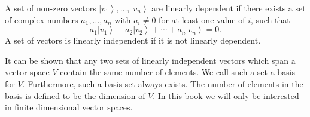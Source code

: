 A set of non-zero vectors $\left|v_{1}\right\rangle, \ldots,\left|v_{n}\right\rangle$ are linearly dependent if there exists a set of complex numbers $a_{1}, \ldots, a_{n}$ with $a_{i} \neq 0$ for at least one value of $i$, such that
$$
a_{1}\left|v_{1}\right\rangle+a_{2}\left|v_{2}\right\rangle+\cdots+a_{n}\left|v_{n}\right\rangle=0.
$$
A set of vectors is linearly independent if it is not linearly dependent. 

It can be shown that any two sets of linearly independent vectors which span a vector space $V$ contain the same number of elements. We call such a set a basis for $V$. Furthermore, such a basis set always exists. The number of elements in the basis is defined to be the dimension of $V$. In this book we will only be interested in finite dimensional vector spaces. 

